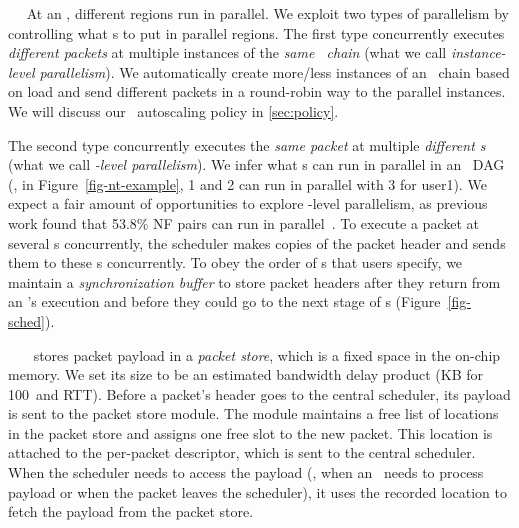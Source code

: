 ~~
At an \snic, different regions run in parallel.
We exploit two types of parallelism by controlling what \nt{}s to put in parallel regions.
The first type concurrently executes {\em different packets} at multiple instances of the {\em same \nt\ chain} (what we call {\em instance-level parallelism}).
We automatically create more/less instances of an \nt\ chain based on load and send different packets in a round-robin way to the parallel instances.
We will discuss our \nt\ autoscaling policy in \ref{sec:policy}.


The second type concurrently executes the {\em same packet} at multiple {\em different \nt{}s} (what we call {\em \nt-level parallelism}).
We infer what \nt{}s can run in parallel in an \nt\ DAG (\eg, in Figure~\ref{fig-nt-example}, \nt{}1 and \nt{}2 can run in parallel with \nt{}3 for user1).
We expect a fair amount of opportunities to explore \nt-level parallelism, as previous work found that 53.8\% NF pairs can run in parallel~\cite{NFP-sigcomm17}.
To execute a packet at several \nt{}s concurrently, the scheduler makes copies of the packet header and sends them to these \nt{}s concurrently. To obey the order of \nt{}s that users specify, we maintain a {\em synchronization buffer} to store packet headers after they return from an \nt{}'s execution and before they could go to the next stage of \nt{}s (Figure~\ref{fig-sched}).




~~
\snic\ stores packet payload in a {\em packet store}, which is a fixed space in the on-chip memory. We set its size to be an estimated bandwidth delay product (KB for 100\Gbps\ and  RTT).
Before a packet's header goes to the central scheduler, its payload is sent to the packet store module.
The module maintains a free list of locations in the packet store and assigns one free slot to the new packet. 
This location is attached to the per-packet descriptor, which is sent to the central scheduler.
When the scheduler needs to access the payload (\eg, when an \nt\ needs to process payload or when the packet leaves the scheduler), it uses the recorded location to fetch the payload from the packet store.
\fi



